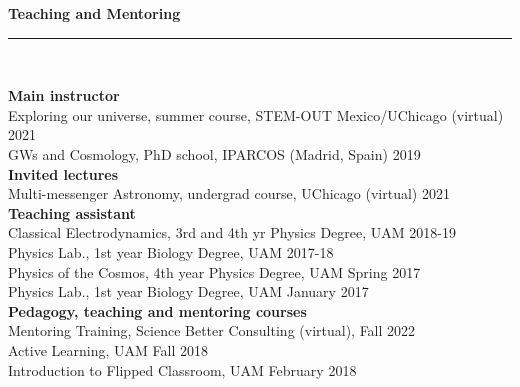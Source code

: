 \documentclass[11pt,a4paper]{article}
\newcommand{\secsizesmall}{0.05\linewidth}
\newcommand{\contsizelong}{0.95\linewidth}
\newcommand{\sectionsep}{12pt}
\begin{document}
\vspace{-5pt}
\vspace{\sectionsep}
\textbf{Teaching and Mentoring} \vspace{-8pt}\\ {\rule{\linewidth}{0.6pt}}\vspace{3pt}\\
\begin{minipage}[t]{\secsizesmall}
\begin{flushleft}
\end{flushleft}
\end{minipage}
\begin{minipage}[t]{\contsizelong}
\begin{flushleft}
\textbf{Main instructor}\\
Exploring our universe, summer course, STEM-OUT Mexico/UChicago (virtual) \hfill  2021 \\%
GWs and Cosmology, PhD school, IPARCOS (Madrid, Spain) \hfill  2019 \\
\vspace{5pt}
\textbf{Invited lectures}\\
Multi-messenger Astronomy, undergrad course, UChicago (virtual) \hfill  2021 \\%
\vspace{5pt}
\textbf{Teaching assistant}\\
Classical Electrodynamics, 3rd and 4th yr Physics Degree, UAM \hfill 2018-19 \\
Physics Lab., 1st year Biology Degree, UAM \hfill 2017-18 \\
Physics of the Cosmos, 4th year Physics Degree, UAM \hfill Spring 2017 \\
Physics Lab., 1st year Biology Degree, UAM \hfill January 2017\\
\vspace{5pt}
\textbf{Pedagogy, teaching and mentoring courses} \\
Mentoring Training, Science Better Consulting (virtual), \hfill Fall 2022 \\
Active Learning, UAM \hfill Fall 2018 \\
Introduction to Flipped Classroom, UAM \hfill February 2018\\
\vspace{5pt}

\end{flushleft}
\end{minipage}
\end{document}
